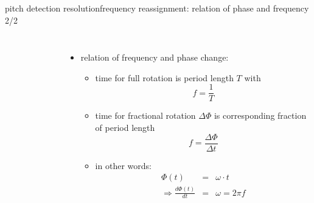         \begin{frame}{pitch detection resolution}{frequency reassignment: relation of phase and frequency 2/2}

            \begin{columns}
                \begin{figure}
                \begin{tiny}
                \end{tiny}
                \end{figure}
            \begin{itemize}
								\vspace{-5mm}
                \item   relation of frequency and phase change:
										\smallskip
                    \begin{itemize}
                        \item<2-> time for full rotation is period length $T$ with \[f = \frac{1}{T}\]
                        \item<3-> time for fractional rotation $\Delta\Phi$ is corresponding fraction of period length \[f = \frac{\Delta\Phi}{\Delta t}\]
                        \item<4-> in other words: 
                        \begin{eqnarray*}
                            \Phi(t) &=& \omega\cdot t\\
                            \Rightarrow \frac{d\Phi(t)}{dt} &=& \omega = 2\pi f
                        \end{eqnarray*}
                    \end{itemize}
            \end{itemize}
            \end{columns}
        \end{frame}
